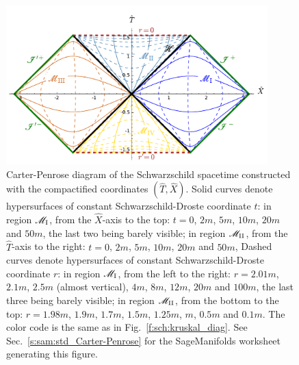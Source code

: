 \begin{figure}
\centerline{\includegraphics[width=0.9\textwidth]{max_carter-penrose-std.pdf}}
\caption[]{\label{f:max:carter-penrose-std} \footnotesize
Carter-Penrose diagram of the Schwarzschild spacetime
constructed with the compactified coordinates $(\hat{T},\hat{X})$.
Solid curves denote hypersurfaces of constant Schwarzschild-Droste coordinate
$t$: in region $\mathscr{M}_{\rm I}$, from the $\hat{X}$-axis to the top: $t=0$, $2m$,
$5m$, $10m$, $20m$ and $50m$, the last two being barely visible;
in region $\mathscr{M}_{\rm II}$, from the $\hat{T}$-axis
to the right: $t=0$, $2m$, $5m$, $10m$, $20m$ and $50m$,
Dashed curves denote hypersurfaces of constant Schwarzschild-Droste coordinate
$r$: in region $\mathscr{M}_{\rm I}$, from the left to the right: $r=2.01m$, $2.1m$, $2.5m$ (almost vertical), $4m$, $8m$, $12m$, $20m$ and $100m$, the last three being barely visible;
in region $\mathscr{M}_{\rm II}$, from the bottom to the top: $r=1.98m$, $1.9m$, $1.7m$,
$1.5m$, $1.25m$, $m$, $0.5m$ and $0.1m$.
The color code
is the same as in Fig.~\ref{f:sch:kruskal_diag}.
See Sec.~\ref{s:sam:std_Carter-Penrose} for the
SageManifolds worksheet generating this figure.}
\end{figure}


